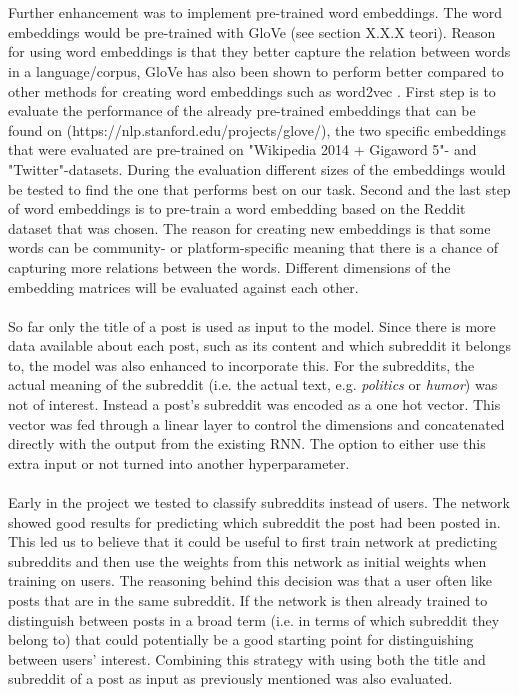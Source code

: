 \\\\
Further enhancement was to implement pre-trained word embeddings. The word embeddings would be pre-trained with GloVe (see section X.X.X teori). Reason for using word embeddings is that they better capture the relation between words in a language/corpus, GloVe has also been shown to perform better compared to other methods for creating word embeddings such as word2vec \parencite{pennington2014glove}. First step is to evaluate the performance of the already pre-trained embeddings that can be found on (https://nlp.stanford.edu/projects/glove/), the two specific embeddings that were evaluated are pre-trained on "Wikipedia 2014 + Gigaword 5"- and "Twitter"-datasets. During the evaluation different sizes of the embeddings would be tested to find the one that performs best on our task. Second and the last step of word embeddings is to pre-train a word embedding based on the Reddit dataset that was chosen. 
The reason for creating new embeddings is that some words can be community- or platform-specific meaning that there is a chance of capturing more relations between the words. Different dimensions of the embedding matrices will be evaluated against each other. 
\\\\
So far only the title of a post is used as input to the model. Since there is more data available about each post, such as its content and which subreddit it belongs to, the model was also enhanced to incorporate this. For the subreddits, the actual meaning of the subreddit (i.e. the actual text, e.g. \textit{politics} or \textit{humor}) was not of interest. Instead a post's subreddit was encoded as a one hot vector. This vector was fed through a linear layer to control the dimensions and concatenated directly with the output from the existing RNN. The option to either use this extra input or not turned into another hyperparameter.
\\\\
Early in the project we tested to classify subreddits instead of users. The network showed good results for predicting which subreddit the post had been posted in. This led us to believe that it could be useful to first train network at predicting subreddits and then use the weights from this network as initial weights when training on users. The reasoning behind this decision was that a user often like posts that are in the same subreddit. If the network is then already trained to distinguish between posts in a broad term (i.e. in terms of which subreddit they belong to) that could potentially be a good starting point for distinguishing between users' interest. Combining this strategy with using both the title and subreddit of a post as input as previously mentioned was also evaluated.
